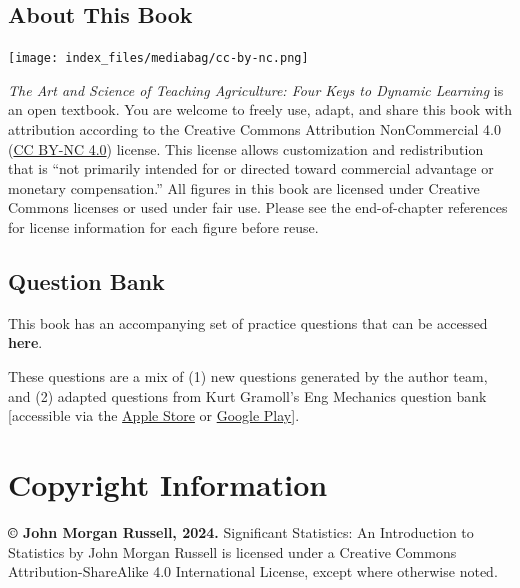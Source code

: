 \documentclass[
  letterpaper,
  DIV=11,
  numbers=noendperiod]{scrreprt}
\theoremstyle{definition}
\theoremstyle{remark}
\begin{document}
\subsection*{\texorpdfstring{\textbf{About This
Book}}{About This Book}}\label{about-this-book}

\texttt{[image: index\_files/mediabag/cc-by-nc.png]}

\emph{The Art and Science of Teaching Agriculture: Four Keys to Dynamic
Learning} is an open textbook. You are welcome to freely use, adapt, and
share this book with attribution according to the Creative Commons
Attribution NonCommercial 4.0
(\href{https://creativecommons.org/licenses/by-nc/4.0/deed.en}{CC BY-NC
4.0}) license. This license allows customization and redistribution that
is ``not primarily intended for or directed toward commercial advantage
or monetary compensation.'' All figures in this book are licensed under
Creative Commons licenses or used under fair use. Please see the
end-of-chapter references for license information for each figure before
reuse.

\subsection*{\texorpdfstring{\textbf{Question
Bank}}{Question Bank}}\label{question-bank}

This book has an accompanying set of practice questions that can be
accessed \textbf{here}.

These questions are a mix of (1) new questions generated by the author
team, and (2) adapted questions from Kurt Gramoll's Eng Mechanics
question bank {[}accessible via the
\href{https://apps.apple.com/us/app/eng-mechanics/id1526030024}{Apple
Store} or
\href{https://play.google.com/store/apps/details?id=air.com.gramago.engProbME&pli=1}{Google
Play}{]}.

\section*{Copyright Information}\label{copyright-information}


\textbf{© John Morgan Russell, 2024.} Significant Statistics: An
Introduction to Statistics by John Morgan Russell is licensed under a
Creative Commons Attribution-ShareAlike 4.0 International License,
except where otherwise noted.
\end{document}
